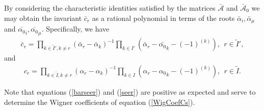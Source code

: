 \documentclass[12pt]{article}
\begin{document}
By considering the characteristic identities satisfied by the matrices $\bar{\mathcal{A}}$ and $\bar{\mathcal{A}}_0$ we may obtain the invariant $\bar{c}_r$ as a rational polynomial in terms of the roots $\bar{\alpha}_i,\bar{\alpha}_\mu$ and $\bar{\alpha_0}_i,\bar{\alpha_0}_\mu$. Specifically, we have \cite{GIW1}
\begin{align}
\bar{c}_r = \prod_{k\in \tilde{I}',k\neq r} \left(\bar{\alpha}_r - \bar{\alpha}_k\right)^{-1}\prod_{k\in
I'} \left(\bar{\alpha}_r - \bar{\alpha_0}_k - (-1)^{(k)}\right),\ \ r\in \tilde{I}',
\label{barseer}
\end{align}
and
\begin{align}
c_r = \prod_{k\in \tilde{I},k\neq r} \left(\alpha_r - \alpha_k \right)^{-1}\prod_{k\in
I} \left(\alpha_r - {\alpha_0}_k - (-1)^{(k)}\right),\ \ r\in \tilde{I} .
\label{seer}
\end{align}

Note that equations (\ref{barseer}) and (\ref{seer}) are positive as expected and serve to determine the Wigner coefficients of equation (\ref{WigCoefCs}).
\end{document}
